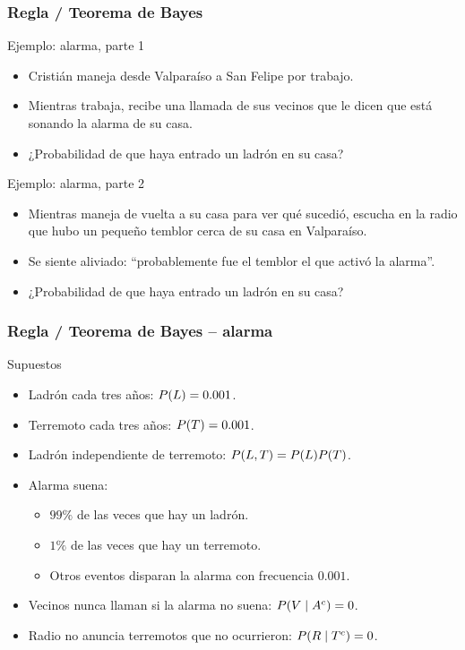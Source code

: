 \documentclass[table]{beamer}
\begin{document}
\begin{frame}
    \frametitle{Regla / Teorema de Bayes}
    \begin{block}{Ejemplo: alarma, parte 1}
        \begin{itemize}
            \item Cristián maneja desde Valparaíso a San Felipe por trabajo.
            \item Mientras trabaja, recibe una llamada de sus vecinos que le dicen que está sonando la alarma de su casa.
            \item ¿Probabilidad de que haya entrado un ladrón en su casa?
        \end{itemize}
    \end{block}
    \begin{block}{Ejemplo: alarma, parte 2}
        \begin{itemize}
            \item Mientras maneja de vuelta a su casa para ver qué sucedió, escucha en la radio que hubo un pequeño temblor cerca de su casa en Valparaíso.
            \item Se siente aliviado: ``probablemente fue el temblor el que activó la alarma''.
            \item ¿Probabilidad de que haya entrado un ladrón en su casa?
        \end{itemize}
    \end{block}
\end{frame}

\begin{frame}
    \frametitle{Regla / Teorema de Bayes -- alarma}
    \begin{block}{Supuestos}
        \begin{itemize}
            \item Ladrón cada tres años: $\prob{L} = 0.001$.
            \item Terremoto cada tres años: $\prob{T} = 0.001$.
            \item Ladrón independiente de terremoto: $\prob{L, T} = \prob{L} \prob{T}$.
            \item Alarma suena:
                \begin{itemize}
                    \item $99\%$ de las veces que hay un ladrón.
                    \item $1\%$ de las veces que hay un terremoto.
                    \item Otros eventos disparan la alarma con frecuencia $0.001$.
                \end{itemize}
            \item Vecinos nunca llaman si la alarma no suena: $\prob{V \mid A^{c}} = 0$.
            \item Radio no anuncia terremotos que no ocurrieron: $\prob{R \mid T^{c}} = 0$.
        \end{itemize}
    \end{block}
\end{frame}
\end{document}
